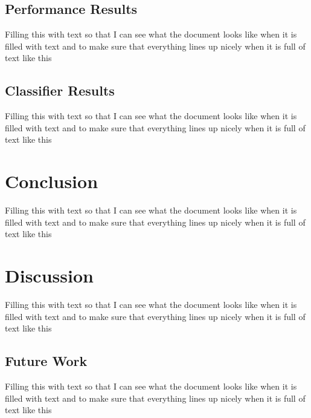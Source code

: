 \documentclass[11pt]{article}       %
\begin{document}
\subsection{Performance Results} \label{performance}
Filling this with text so that I can see what the document looks like when it is filled with text and to make sure that everything lines up nicely when it is full of text like this

\subsection{Classifier Results} \label{results}
Filling this with text so that I can see what the document looks like when it is filled with text and to make sure that everything lines up nicely when it is full of text like this

\section{Conclusion} \label{concl}
Filling this with text so that I can see what the document looks like when it is filled with text and to make sure that everything lines up nicely when it is full of text like this

\section{Discussion} \label{disc}
Filling this with text so that I can see what the document looks like when it is filled with text and to make sure that everything lines up nicely when it is full of text like this

\subsection{Future Work} \label{future}
Filling this with text so that I can see what the document looks like when it is filled with text and to make sure that everything lines up nicely when it is full of text like this



\end{document}

